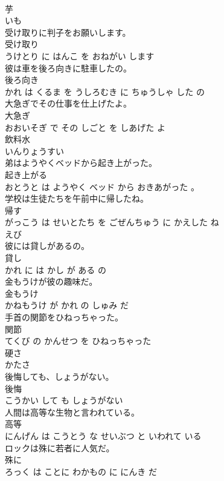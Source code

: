 \documentclass[8pt]{extreport}
\begin{document}
\begin{CJK}{UTF8}{min}
\\	芋	
\\	いも			
\\	受け取りに判子をお願いします。	
\\	受け取り 
\\	うけとり に はんこ を おねがい します			
\\	彼は車を後ろ向きに駐車したの。	
\\	後ろ向き 
\\	かれ は くるま を うしろむき に ちゅうしゃ した の			
\\	大急ぎでその仕事を仕上げたよ。	
\\	大急ぎ 
\\	おおいそぎ で その しごと を しあげた よ			
\\	飲料水	
\\	いんりょうすい			
\\	弟はようやくベッドから起き上がった。	
\\	起き上がる 
\\	おとうと は ようやく ベッド から おきあがった 。			
\\	学校は生徒たちを午前中に帰したね。	
\\	帰す 
\\	がっこう は せいとたち を ごぜんちゅう に かえした ね			
\\	えび	
\\	彼には貸しがあるの。	
\\	貸し 
\\	かれ に は かし が ある の			
\\	金もうけが彼の趣味だ。	
\\	金もうけ 
\\	かねもうけ が かれ の しゅみ だ			
\\	手首の関節をひねっちゃった。	
\\	関節 
\\	てくび の かんせつ を ひねっちゃった			
\\	硬さ	
\\	かたさ			
\\	後悔しても、しょうがない。	
\\	後悔 
\\	こうかい して も しょうがない			
\\	人間は高等な生物と言われている。	
\\	高等 
\\	にんげん は こうとう な せいぶつ と いわれて いる			
\\	ロックは殊に若者に人気だ。	
\\	殊に 
\\	ろっく は ことに わかもの に にんき だ			

\end{CJK}
\end{document}
